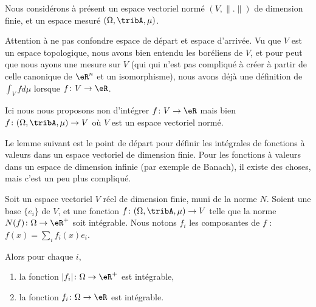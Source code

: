 \begin{normaltext}      \label{NORMooTQBIooBaScjt}
	Nous considérons à présent un espace vectoriel normé \( (V,\| . \|)\) de dimension finie, et un espace mesuré \( (\Omega,\tribA,\mu)\).

	Attention à ne pas confondre espace de départ et espace d'arrivée. Vu que \( V\) est un espace topologique, nous avons bien entendu les boréliens de \( V\), et pour peut que nous ayons une mesure sur \( V\) (qui qui n'est pas compliqué à créer à partir de celle canonique de \( \eR^n\) et un isomorphisme), nous avons déjà une définition de \( \int_Vfd\mu\) lorsque \( f\colon V\to \eR\).

	Ici nous nous proposons non d'intégrer \( f\colon V\to \eR\) mais bien \( f\colon (\Omega,\tribA,\mu)\to V\) où \( V\) est un espace vectoriel normé.

	Le lemme suivant est le point de départ pour définir les intégrales de fonctions à valeurs dans un espace vectoriel de dimension finie. Pour les fonctions à valeurs dans un espace de dimension infinie (par exemple de Banach), il existe des choses, mais c'est un peu plus compliqué.
\end{normaltext}

\begin{lemma}        \label{LEMooCVHDooLJASAs}
	Soit un espace vectoriel \( V\) réel de dimension finie, muni de la norme \( N\). Soient une base \( \{ e_i \}\) de \( V\), et une fonction \( f\colon (\Omega,\tribA,\mu)\to V\) telle que la norme \( N(f)\colon \Omega\to \eR^+\) soit intégrable. Nous notons \( f_i\) les composantes de \( f\) : \( f(x)=\sum_if_i(x)e_i\).

	Alors pour chaque \( i\),
	\begin{enumerate}
		\item
		      la fonction \( | f_i |\colon \Omega\to \eR^+\) est intégrable,
		\item
		      la fonction \( f_i\colon \Omega\to \eR\) est intégrable.
	\end{enumerate}
\end{lemma}

